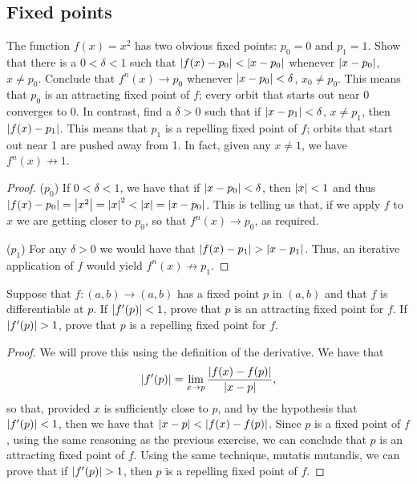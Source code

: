 \subsection{Fixed points}


\begin{exercise}{36}
The function $f(x)=x^2$ has two obvious fixed points: $p_0=0$ and $p_1=1$.
Show that there is a $0<\delta<1$ such that $\left\lvert f(x)-p_0\right\rvert<\left\lvert x-p_0\right\rvert$ whenever $\left\lvert x-p_0\right\rvert$, $x\neq p_0$.
Conclude that $f^n(x)\to p_0$ whenever $\left\lvert x-p_0\right\rvert<\delta$, $x_0\neq p_0$.
This means that $p_0$ is an attracting fixed point of $f$;
every orbit that starts out near 0 converges to 0.
In contrast, find a $\delta>0$ such that if $\left\lvert x-p_1\right\rvert<\delta$, $x\neq p_1$, then $\left\lvert f(x)-p_1\right\rvert$.
This means that $p_1$ is a repelling fixed point of $f$;
orbits that start out near 1 are pushed away from 1.
In fact, given any $x\neq 1$, we have $f^n(x)\not\to 1$.
\end{exercise}
\begin{proof}
($p_0$)
If $0<\delta<1$, we have that if $\left\lvert x-p_0\right\rvert<\delta$, then $\left\lvert x\right\rvert<1$ and thus $\left\lvert f(x)-p_0\right\rvert = \left\lvert x^2\right\rvert = \left\lvert x\right\rvert^2 < \left\lvert x\right\rvert = \left\lvert x-p_0\right\rvert$.
This is telling us that, if we apply $f$ to $x$ we are getting closer to $p_0$, so that $f^n(x)\to p_0$, as required.

($p_1$)
For any $\delta>0$ we would have that $\left\lvert f(x)-p_1\right\rvert > \left\lvert x-p_1\right\rvert$.
Thus, an iterative application of $f$ would yield $f^n(x)\not\to p_1$.
\end{proof} 

\begin{exercise}{37}
Suppose that $f:(a,b)\to(a,b)$ has a fixed point $p$ in $(a,b)$ and that $f$ is differentiable at $p$.
If $\left\lvert f'(p)\right\rvert<1$, prove that $p$ is an attracting fixed point for $f$.
If $\left\lvert f'(p)\right\rvert>1$, prove that $p$ is a repelling fixed point for $f$.
\end{exercise}
\begin{proof}
We will prove this using the definition of the derivative.
We have that 
\begin{align*}
    \left\lvert f'(p)\right\rvert = \lim_{x\to p} \frac{\left\lvert f(x)-f(p)\right\rvert}{\left\lvert x-p\right\rvert},
\end{align*}
so that, provided $x$ is sufficiently close to $p$, and by the hypothesis that $\left\lvert f'(p)\right\rvert<1$, then we have that $\left\lvert x-p\right\rvert<\left\lvert f(x)-f(p)\right\rvert$.
Since $p$ is a fixed point of $f$, using the same reasoning as the previous exercise, we can conclude that $p$ is an attracting fixed point of $f$.
Using the same technique, mutatis mutandis, we can prove that if $\left\lvert f'(p)\right\rvert>1$, then $p$ is a repelling fixed point of $f$.
\end{proof} 

